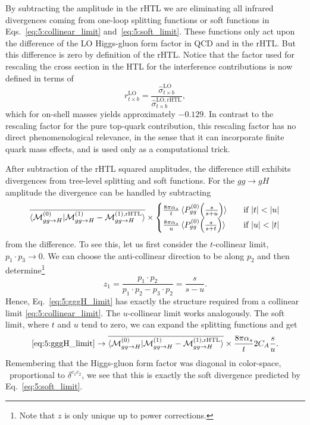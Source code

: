 By subtracting the amplitude in the \acs{rHTL} we are eliminating all infrared divergences coming from one-loop splitting functions or soft functions in Eqs.~\eqref{eq:5:collinear_limit} and\ \eqref{eq:5:soft_limit}. These functions only act upon the difference of the \acs{LO} Higgs-gluon form factor in \acs{QCD} and in the \acs{rHTL}. But this difference is zero by definition of the \acs{rHTL}. Notice that the factor used for rescaling the cross section in the \acs{HTL} for the interference contributions is now defined in terms of
\begin{equation}
r^\mathrm{LO}_{t \times b} = \frac{\hat{\sigma}_{t \times b}^{\mathrm{LO}}}{\hat{\sigma}_{t \times b}^{\mathrm{LO}, \mathrm{rHTL}}},
\end{equation}
which for on-shell masses yields approximately $-0.129$. In contrast to the rescaling factor for the pure top-quark contribution, this rescaling factor has no direct phenomenological relevance, in the sense that it can incorporate finite quark mass effects, and is used only as a computational trick.

After subtraction of the \acs{rHTL} squared amplitudes, the difference still exhibits divergences from tree-level splitting and soft functions. For the $gg \longrightarrow g H$ amplitude the divergence can be handled by subtracting
\begin{equation}
\overline{\braket{\mathcal{M}^{(0)}_{gg \rightarrow H} | \mathcal{M}^{(1)}_{gg \rightarrow H} - \mathcal{M}^{(1), \text{rHTL}}_{gg \rightarrow H}}}  \times \begin{cases} \frac{8 \pi \alpha_s}{t} \braket{P_{gg}^{(0)} \!\left(\frac{s}{s + u} \right)} \quad &\text{if } |t| < |u| \\
\frac{8 \pi \alpha_s}{u} \braket{P_{gg}^{(0)} \!\left(\frac{s}{s + t} \right)} \quad &\text{if } |u| < |t|
\end{cases}
\label{eq:5:gggH_limit}
\end{equation}
from the difference. To see this, let us first consider the $t$-collinear limit, \ie\ $p_1 \cdot p_3 \rightarrow 0$. We can choose the anti-collinear direction to be along $p_2$ and then determine\footnote{Note that $z$ is only unique up to power corrections.}
\begin{equation}
z_1 = \frac{p_1 \cdot p_2}{p_1 \cdot p_2 - p_3 \cdot p_2} = \frac{s}{s - u}.
\end{equation}
Hence, Eq.~\eqref{eq:5:gggH_limit} has exactly the structure required from a collinear limit \eqref{eq:5:collinear_limit}. The $u$-collinear limit works analogously. The soft limit, where $t$ and $u$ tend to zero, we can expand the splitting functions and get
\begin{equation}
\eqref{eq:5:gggH_limit} \rightarrow \overline{\braket{\mathcal{M}^{(0)}_{gg \rightarrow H} | \mathcal{M}^{(1)}_{gg \rightarrow H} - \mathcal{M}^{(1), \text{rHTL}}_{gg \rightarrow H}}}  \times  \frac{8 \pi \alpha_s}{t} 2 C_A \frac{s}{u}.
\end{equation}
Remembering that the Higgs-gluon form factor was diagonal in color-space, \ie\ proportional to $\delta^{c_1 c_2}$, we see that this is exactly the soft divergence predicted by Eq.~\eqref{eq:5:soft_limit}.

